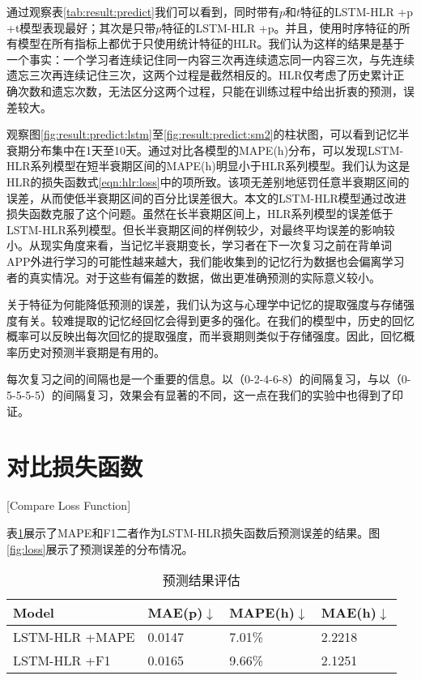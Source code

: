 通过观察表\ref{tab:result:predict}我们可以看到，同时带有$p$和$t$特征的LSTM-HLR +p +t模型表现最好；其次是只带$p$特征的LSTM-HLR +p。并且，使用时序特征的所有模型在所有指标上都优于只使用统计特征的HLR。我们认为这样的结果是基于一个事实：一个学习者连续记住同一内容三次再连续遗忘同一内容三次，与先连续遗忘三次再连续记住三次，这两个过程是截然相反的。HLR仅考虑了历史累计正确次数和遗忘次数，无法区分这两个过程，只能在训练过程中给出折衷的预测，误差较大。

观察图\ref{fig:result:predict:lstm}至\ref{fig:result:predict:sm2}的柱状图，可以看到记忆半衰期分布集中在1天至10天。通过对比各模型的MAPE(h)分布，可以发现LSTM-HLR系列模型在短半衰期区间的MAPE(h)明显小于HLR系列模型。我们认为这是HLR的损失函数式\ref{eqn:hlr:loss}中的项所致。该项无差别地惩罚任意半衰期区间的误差，从而使低半衰期区间的百分比误差很大。本文的LSTM-HLR模型通过改进损失函数克服了这个问题。虽然在长半衰期区间上，HLR系列模型的误差低于LSTM-HLR系列模型。但长半衰期区间的样例较少，对最终平均误差的影响较小。从现实角度来看，当记忆半衰期变长，学习者在下一次复习之前在背单词APP外进行学习的可能性越来越大，我们能收集到的记忆行为数据也会偏离学习者的真实情况。对于这些有偏差的数据，做出更准确预测的实际意义较小。

关于特征为何能降低预测的误差，我们认为这与心理学中记忆的提取强度与存储强度有关。较难提取的记忆经回忆会得到更多的强化\cite{bjorkNewTheoryDisuse1992}。在我们的模型中，历史的回忆概率可以反映出每次回忆的提取强度，而半衰期则类似于存储强度。因此，回忆概率历史对预测半衰期是有用的。

每次复习之间的间隔也是一个重要的信息。以（0-2-4-6-8）的间隔复习，与以（0-5-5-5-5）的间隔复习，效果会有显著的不同\cite{maddoxRoleForgettingRate2011}，这一点在我们的实验中也得到了印证。

\section{对比损失函数}[Compare Loss Function]

表\ref{tab:loss}展示了MAPE和F1二者作为LSTM-HLR损失函数后预测误差的结果。图\ref{fig:loss}展示了预测误差的分布情况。

\begin{table}[htbp]
    \caption{预测结果评估}
    \label{tab:loss}
    \vspace{0.5em}\centering\wuhao
    \begin{tabular}{llll}
    \toprule[1.5pt]
    \textbf{Model}  &\textbf{MAE(p)}$\downarrow$ &\textbf{MAPE(h)}$\downarrow$ &\textbf{MAE(h)}$\downarrow$\\
    \midrule[1pt]
    LSTM-HLR +MAPE  &0.0147   &7.01\%   &2.2218\\
    LSTM-HLR +F1    &0.0165   &9.66\%   &2.1251\\
    \bottomrule[1.5pt]
    \end{tabular}
\end{table}

